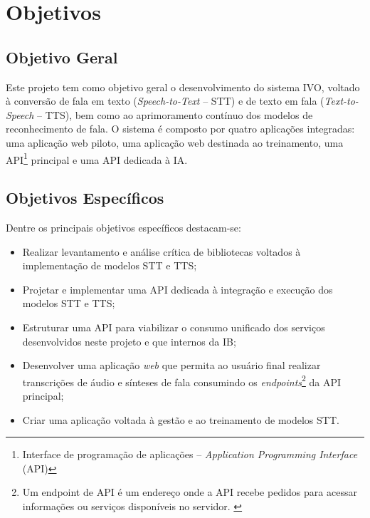 \documentclass[
	12pt,				%
	a4paper,			%
	english,			%
	brazil,				%
	]{article}
\begin{document}
\section{Objetivos}

\subsection{Objetivo Geral}

Este projeto tem como objetivo geral o desenvolvimento do sistema IVO, voltado à conversão de fala em texto (\textit{Speech-to-Text} – STT) e de texto em fala (\textit{Text-to-Speech} – TTS), bem como ao aprimoramento contínuo dos modelos de reconhecimento de fala. O sistema é composto por quatro aplicações integradas: uma aplicação web piloto, uma aplicação web destinada ao treinamento, uma API\footnote{Interface de programação de aplicações – \textit{Application Programming Interface} (API)} principal e uma API dedicada à IA.


\subsection{Objetivos Específicos}

Dentre os principais objetivos específicos destacam-se:

\begin{itemize}
	\item Realizar levantamento e análise crítica de bibliotecas voltados à implementação de modelos STT e TTS;
	
	\item Projetar e implementar uma API dedicada à integração e execução dos modelos STT e TTS;
	
	\item Estruturar uma API para viabilizar o consumo unificado dos serviços desenvolvidos neste projeto e que internos da IB;
	
	\item Desenvolver uma aplicação \textit{web} que permita ao usuário final realizar transcrições de áudio e sínteses de fala consumindo os \textit{endpoints}\footnote{Um endpoint de API é um endereço onde a API recebe pedidos para acessar informações ou serviços disponíveis no servidor. \cite{nosowitz2024}} da API principal;
	
	\item Criar uma aplicação voltada à gestão e ao treinamento de modelos STT. 
\end{itemize}
\end{document}
